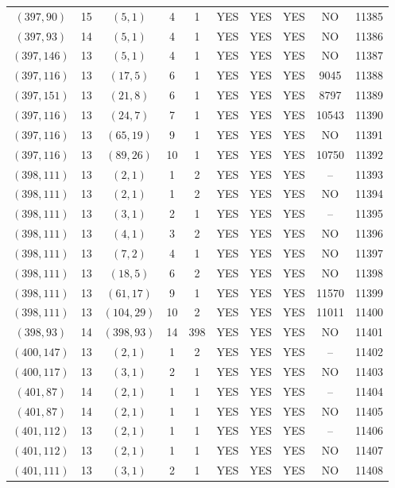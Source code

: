 \begin{longtable}{|c|c|c|c|c|c|c|c|c|c|}
$(397, 90)$ & 15 & $(5, 1)$ & 4 & 1 & YES & YES & YES & NO & 11385\\
$(397, 93)$ & 14 & $(5, 1)$ & 4 & 1 & YES & YES & YES & NO & 11386\\
$(397, 146)$ & 13 & $(5, 1)$ & 4 & 1 & YES & YES & YES & NO & 11387\\
$(397, 116)$ & 13 & $(17, 5)$ & 6 & 1 & YES & YES & YES & 9045 & 11388\\
$(397, 151)$ & 13 & $(21, 8)$ & 6 & 1 & YES & YES & YES & 8797 & 11389\\
$(397, 116)$ & 13 & $(24, 7)$ & 7 & 1 & YES & YES & YES & 10543 & 11390\\
$(397, 116)$ & 13 & $(65, 19)$ & 9 & 1 & YES & YES & YES & NO & 11391\\
$(397, 116)$ & 13 & $(89, 26)$ & 10 & 1 & YES & YES & YES & 10750 & 11392\\
$(398, 111)$ & 13 & $(2, 1)$ & 1 & 2 & YES & YES & YES & -- & 11393\\
$(398, 111)$ & 13 & $(2, 1)$ & 1 & 2 & YES & YES & YES & NO & 11394\\
$(398, 111)$ & 13 & $(3, 1)$ & 2 & 1 & YES & YES & YES & -- & 11395\\
$(398, 111)$ & 13 & $(4, 1)$ & 3 & 2 & YES & YES & YES & NO & 11396\\
$(398, 111)$ & 13 & $(7, 2)$ & 4 & 1 & YES & YES & YES & NO & 11397\\
$(398, 111)$ & 13 & $(18, 5)$ & 6 & 2 & YES & YES & YES & NO & 11398\\
$(398, 111)$ & 13 & $(61, 17)$ & 9 & 1 & YES & YES & YES & 11570 & 11399\\
$(398, 111)$ & 13 & $(104, 29)$ & 10 & 2 & YES & YES & YES & 11011 & 11400\\
$(398, 93)$ & 14 & $(398, 93)$ & 14 & 398 & YES & YES & YES & NO & 11401\\
$(400, 147)$ & 13 & $(2, 1)$ & 1 & 2 & YES & YES & YES & -- & 11402\\
$(400, 117)$ & 13 & $(3, 1)$ & 2 & 1 & YES & YES & YES & NO & 11403\\
$(401, 87)$ & 14 & $(2, 1)$ & 1 & 1 & YES & YES & YES & -- & 11404\\
$(401, 87)$ & 14 & $(2, 1)$ & 1 & 1 & YES & YES & YES & NO & 11405\\
$(401, 112)$ & 13 & $(2, 1)$ & 1 & 1 & YES & YES & YES & -- & 11406\\
$(401, 112)$ & 13 & $(2, 1)$ & 1 & 1 & YES & YES & YES & NO & 11407\\
$(401, 111)$ & 13 & $(3, 1)$ & 2 & 1 & YES & YES & YES & NO & 11408\\

\end{longtable}
